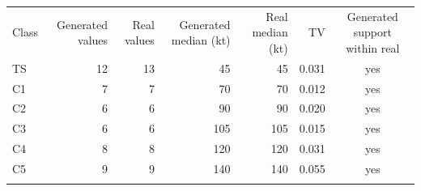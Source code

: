 \begin{tabular}{lrrrrrc}
\tophline
Class & Generated values & Real values & Generated median (kt) & Real median (kt) & TV & Generated support within real\\
\middlehline
TS & 12 & 13 & 45 & 45 & 0.031 & yes\\
C1 & 7 & 7 & 70 & 70 & 0.012 & yes\\
C2 & 6 & 6 & 90 & 90 & 0.020 & yes\\
C3 & 6 & 6 & 105 & 105 & 0.015 & yes\\
C4 & 8 & 8 & 120 & 120 & 0.031 & yes\\
C5 & 9 & 9 & 140 & 140 & 0.055 & yes\\
\bottomhline
\end{tabular}
